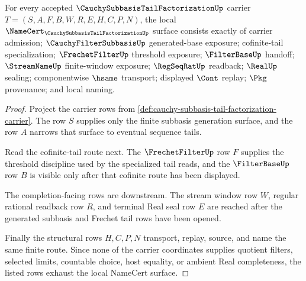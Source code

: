 \begin{theorem}
\label{thm:cauchy-subbasis-tail-factorization-namecert-obligations}
For every accepted $\CauchySubbasisTailFactorizationUp$ carrier $T=(S,A,F,B,W,R,E,H,C,P,N)$, the local $\NameCert_{\CauchySubbasisTailFactorizationUp}$ surface consists exactly of carrier admission; $\CauchyFilterSubbasisUp$ generated-base exposure; cofinite-tail specialization; $\FrechetFilterUp$ threshold exposure; $\FilterBaseUp$ handoff; $\StreamNameUp$ finite-window exposure; $\RegSeqRatUp$ readback; $\RealUp$ sealing; componentwise $\hsame$ transport; displayed $\Cont$ replay; $\Pkg$ provenance; and local naming.
\end{theorem}
\begin{proof}
Project the carrier rows from \autoref{def:cauchy-subbasis-tail-factorization-carrier}. The row $S$ supplies only the finite subbasis generation surface, and the row $A$ narrows that surface to eventual sequence tails.

Read the cofinite-tail route next. The $\FrechetFilterUp$ row $F$ supplies the threshold discipline used by the specialized tail reads, and the $\FilterBaseUp$ row $B$ is visible only after that cofinite route has been displayed.

The completion-facing rows are downstream. The stream window row $W$, regular rational readback row $R$, and terminal Real seal row $E$ are reached after the generated subbasis and Frechet tail rows have been opened.

Finally the structural rows $H,C,P,N$ transport, replay, source, and name the same finite route. Since none of the carrier coordinates supplies quotient filters, selected limits, countable choice, host equality, or ambient Real completeness, the listed rows exhaust the local NameCert surface.
\end{proof}

